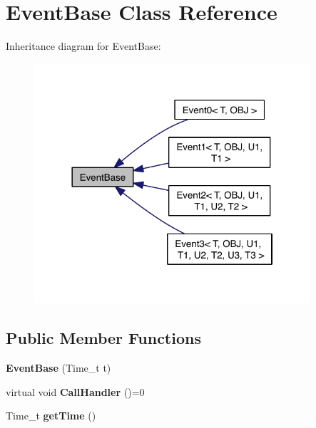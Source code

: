 \hypertarget{class_event_base}{\section{Event\-Base Class Reference}
\label{class_event_base}
}


Inheritance diagram for Event\-Base\-:\nopagebreak
\begin{figure}[H]
\begin{center}
\leavevmode
\includegraphics[width=290pt]{class_event_base__inherit__graph}
\end{center}
\end{figure}
\subsection*{Public Member Functions}
\begin{DoxyCompactItemize}
\item 
\hypertarget{class_event_base_a69050713e15086d940248753af41b50f}{{\bfseries Event\-Base} (Time\-\_\-t t)}\label{class_event_base_a69050713e15086d940248753af41b50f}

\item 
\hypertarget{class_event_base_a121ca64dec88c8d9589c064b0060d037}{virtual void {\bfseries Call\-Handler} ()=0}\label{class_event_base_a121ca64dec88c8d9589c064b0060d037}

\item 
\hypertarget{class_event_base_abf175c0914e2ac5f5d5454868c676959}{Time\-\_\-t {\bfseries get\-Time} ()}\label{class_event_base_abf175c0914e2ac5f5d5454868c676959}

\end{DoxyCompactItemize}
